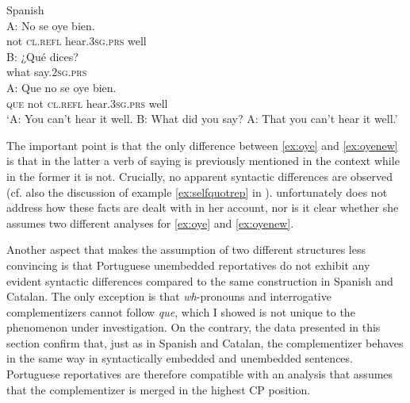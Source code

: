 \ea \label{ex:oyenew}
 Spanish\\ 
\gll A: No se oye bien. \\
{} not \textsc{cl.refl} hear.\textsc{3sg.prs} well\\
\exi{}\gll B: ¿Qué dices?  \\
{} what say.\textsc{2sg.prs}\\
\exi{}\gll A: Que no se oye bien. \\
{} \textsc{que} not \textsc{cl.refl} hear.\textsc{3sg.prs} well\\
\glt `A: You can't hear it well. B: What did you say? A: That you can't hear it well.'
\z



The important point is that the only difference between   \eqref{ex:oye} and \eqref{ex:oyenew} is that in the latter  a verb of saying is previously mentioned in the context while in the former it is not. Crucially,  no apparent syntactic differences are observed (cf. also the discussion of example \eqref{ex:selfquotrep} in ).   \citet{Corr2016} unfortunately does not  address how these facts are dealt with in her account, nor is it clear  whether she assumes  two different analyses for \eqref{ex:oye} and \eqref{ex:oyenew}. 

Another aspect that makes  the assumption of two different structures less convincing is that Portuguese unembedded reportatives do not  exhibit any evident  syntactic differences compared to the same construction in Spanish and Catalan. The only exception  is that  \textit{wh}-pronouns and interrogative complementizers cannot follow \emph{que}, which I showed is not  unique to the phenomenon under investigation. On the contrary, the data presented in this section confirm that, just as in Spanish and Catalan, the complementizer behaves in the same way  in syntactically embedded and unembedded sentences. Portuguese reportatives are therefore compatible with an analysis that assumes that the complementizer is merged in the highest CP position. 


